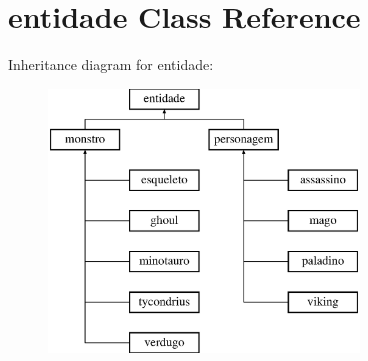 \hypertarget{classentidade}{}\section{entidade Class Reference}
\label{classentidade}
Inheritance diagram for entidade\+:\begin{figure}[H]
\begin{center}
\leavevmode
\includegraphics[height=7.000000cm]{classentidade}
\end{center}
\end{figure}
